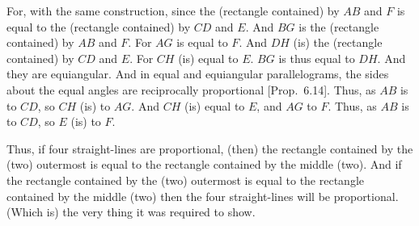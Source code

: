 \begin{Parallel}{}{}
{For,  with the same construction, since the (rectangle contained) by $AB$ and $F$
is equal to the (rectangle contained) by $CD$ and $E$. And $BG$ is the (rectangle
contained) by $AB$ and $F$. For $AG$ is equal to $F$. And $DH$ (is) the
(rectangle contained) by $CD$ and $E$. For $CH$ (is) equal to $E$. $BG$ is thus
equal to $DH$. And they are equiangular.  And in equal and equiangular parallelograms,  the sides about the equal angles are reciprocally
proportional [Prop.~6.14]. Thus, as $AB$
is to $CD$, so $CH$ (is) to $AG$. And $CH$ (is) equal to $E$, and $AG$ to $F$.
Thus, as $AB$  is to $CD$, so $E$ (is) to $F$.

Thus, if four straight-lines are proportional, (then) the
rectangle contained by the (two) outermost is equal to the rectangle contained
by the middle (two). And if the rectangle contained by the (two) outermost
is
equal to the rectangle contained by the middle (two) then the four straight-lines
will be proportional. (Which is) the very thing it was required to show.}
\end{Parallel}

